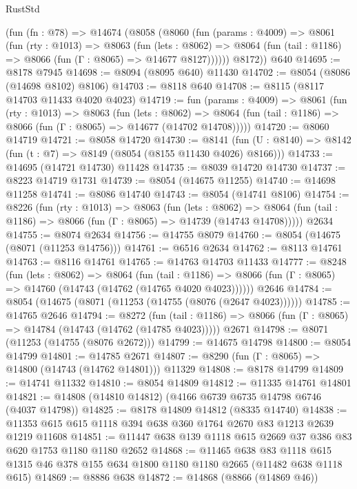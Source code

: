 \begin{lexlean}{RustStd}
\begin{coremodule}
    (fun (fn : @78) =>
    @14674
      (@8058
        (@8060
          (fun (params : @4009) =>
          @8061
            (fun (rty : @1013) =>
            @8063
              (fun (lets : @8062) =>
              @8064 (fun (tail : @1186) => @8066 (fun (Γ : @8065) => @14677 @8127))))))
        @8172))
    @640
@14695 := @8178 @7945
@14698 := @8094 (@8095 @640) @11430
@14702 := @8054 (@8086 (@14698 @8102) @8106)
@14703 := @8118 @640
@14708 := @8115 (@8117 @14703 @11433 @4020 @4023)
@14719 := fun (params : @4009) =>
  @8061
    (fun (rty : @1013) =>
    @8063
      (fun (lets : @8062) =>
      @8064 (fun (tail : @1186) => @8066 (fun (Γ : @8065) => @14677 (@14702 @14708)))))
@14720 := @8060 @14719
@14721 := @8058 @14720
@14730 := @8141
    (fun (U : @8140) => @8142 (fun (t : @7) => @8149 (@8054 (@8155 @11430 @4026) @8166)))
@14733 := @14695 (@14721 @14730) @11428
@14735 := @8039 @14720 @14730
@14737 := @8223 @14719 @1731
@14739 := @8054 (@14675 @11255)
@14740 := @14698 @11258
@14741 := @8086 @14740
@14743 := @8054 (@14741 @8106)
@14754 := @8226
    (fun (rty : @1013) =>
    @8063
      (fun (lets : @8062) =>
      @8064 (fun (tail : @1186) => @8066 (fun (Γ : @8065) => @14739 (@14743 @14708)))))
    @2634
@14755 := @8074 @2634
@14756 := @14755 @8079
@14760 := @8054 (@14675 (@8071 (@11253 @14756)))
@14761 := @6516 @2634
@14762 := @8113 @14761
@14763 := @8116 @14761
@14765 := @14763 @14703 @11433
@14777 := @8248
    (fun (lets : @8062) =>
    @8064
      (fun (tail : @1186) =>
      @8066 (fun (Γ : @8065) => @14760 (@14743 (@14762 (@14765 @4020 @4023))))))
    @2646
@14784 := @8054 (@14675 (@8071 (@11253 (@14755 (@8076 (@2647 @4023))))))
@14785 := @14765 @2646
@14794 := @8272
    (fun (tail : @1186) => @8066 (fun (Γ : @8065) => @14784 (@14743 (@14762 (@14785 @4023)))))
    @2671
@14798 := @8071 (@11253 (@14755 (@8076 @2672)))
@14799 := @14675 @14798
@14800 := @8054 @14799
@14801 := @14785 @2671
@14807 := @8290 (fun (Γ : @8065) => @14800 (@14743 (@14762 @14801))) @11329
@14808 := @8178 @14799
@14809 := @14741 @11332
@14810 := @8054 @14809
@14812 := @11335 @14761 @14801
@14821 := @14808 (@14810 @14812) (@4166 @6739 @6735 @14798 @6746 (@4037 @14798))
@14825 := @8178 @14809 @14812 (@8335 @14740)
@14838 := @11353 @615 @615 @1118 @394 @638 @360 @1764 @2670 @83 @1213 @2639 @1219 @11608
@14851 := @11447 @638 @139 @1118 @615 @2669 @37 @386 @83 @620 @1753 @1180 @1180 @2652
@14868 := @11465
    @638
    @83
    @1118
    @615
    @1315
    @46
    @378
    @155
    @634
    @1800
    @1180
    @1180
    @2665
    (@11482 @638 @1118 @615)
@14869 := @8886 @638
@14872 := @14868 (@8866 (@14869 @46))

\end{coremodule}
\end{lexlean}
